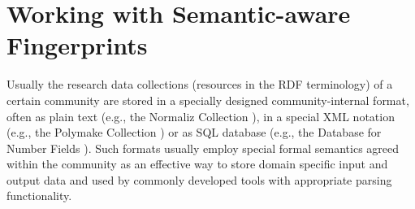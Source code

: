 \documentclass[runningheads,a4paper]{llncs}
\begin{document}
\section{Working with Semantic-aware Fingerprints}

Usually the research data collections (resources in the RDF terminology) of a
certain community are stored in a specially designed community-internal format,
often as plain text (e.g., the Normaliz Collection \cite{normaliz}), in a
special XML notation (e.g., the Polymake Collection \cite{polymake}) or as SQL
database (e.g., the Database for Number Fields \cite{MalleKlueners}).  Such
formats usually employ special formal semantics agreed within the community as
an effective way to store domain specific input and output data and used by
commonly developed tools with appropriate parsing functionality.
\end{document}
